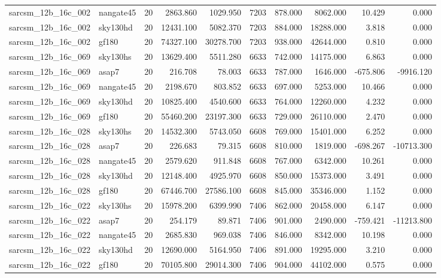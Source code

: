 \documentclass{article}
\begin{document}
\begin{longtable}{llrrrrrrrr}
sarcsm\_12b\_16c\_002 & nangate45 & 20 & 2863.860 & 1029.950 & 7203 & 878.000 & 8062.000 & 10.429 & 0.000 \\
sarcsm\_12b\_16c\_002 & sky130hd & 20 & 12431.100 & 5082.370 & 7203 & 884.000 & 18288.000 & 3.818 & 0.000 \\
sarcsm\_12b\_16c\_002 & gf180 & 20 & 74327.100 & 30278.700 & 7203 & 938.000 & 42644.000 & 0.810 & 0.000 \\
sarcsm\_12b\_16c\_069 & sky130hs & 20 & 13629.400 & 5511.280 & 6633 & 742.000 & 14175.000 & 6.863 & 0.000 \\
sarcsm\_12b\_16c\_069 & asap7 & 20 & 216.708 & 78.003 & 6633 & 787.000 & 1646.000 & -675.806 & -9916.120 \\
sarcsm\_12b\_16c\_069 & nangate45 & 20 & 2198.670 & 803.852 & 6633 & 697.000 & 5253.000 & 10.466 & 0.000 \\
sarcsm\_12b\_16c\_069 & sky130hd & 20 & 10825.400 & 4540.600 & 6633 & 764.000 & 12260.000 & 4.232 & 0.000 \\
sarcsm\_12b\_16c\_069 & gf180 & 20 & 55460.200 & 23197.300 & 6633 & 729.000 & 26110.000 & 2.470 & 0.000 \\
sarcsm\_12b\_16c\_028 & sky130hs & 20 & 14532.300 & 5743.050 & 6608 & 769.000 & 15401.000 & 6.252 & 0.000 \\
sarcsm\_12b\_16c\_028 & asap7 & 20 & 226.683 & 79.315 & 6608 & 810.000 & 1819.000 & -698.267 & -10713.300 \\
sarcsm\_12b\_16c\_028 & nangate45 & 20 & 2579.620 & 911.848 & 6608 & 767.000 & 6342.000 & 10.261 & 0.000 \\
sarcsm\_12b\_16c\_028 & sky130hd & 20 & 12148.400 & 4925.970 & 6608 & 850.000 & 15373.000 & 3.491 & 0.000 \\
sarcsm\_12b\_16c\_028 & gf180 & 20 & 67446.700 & 27586.100 & 6608 & 845.000 & 35346.000 & 1.152 & 0.000 \\
sarcsm\_12b\_16c\_022 & sky130hs & 20 & 15978.200 & 6399.990 & 7406 & 862.000 & 20458.000 & 6.147 & 0.000 \\
sarcsm\_12b\_16c\_022 & asap7 & 20 & 254.179 & 89.871 & 7406 & 901.000 & 2490.000 & -759.421 & -11213.800 \\
sarcsm\_12b\_16c\_022 & nangate45 & 20 & 2685.830 & 969.038 & 7406 & 846.000 & 8342.000 & 10.198 & 0.000 \\
sarcsm\_12b\_16c\_022 & sky130hd & 20 & 12690.000 & 5164.950 & 7406 & 891.000 & 19295.000 & 3.210 & 0.000 \\
sarcsm\_12b\_16c\_022 & gf180 & 20 & 70105.800 & 29014.300 & 7406 & 904.000 & 44102.000 & 0.575 & 0.000 \\

\end{longtable}
\end{document}
